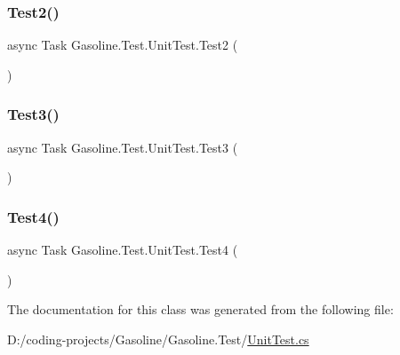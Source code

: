 \mbox{\label{class_gasoline_1_1_test_1_1_unit_test_aabdb54bc89a4d9fc26732e095c0fc06f}} 
\subsubsection{\texorpdfstring{Test2()}{Test2()}}
{\footnotesize\ttfamily async Task Gasoline.\+Test.\+Unit\+Test.\+Test2 (\begin{DoxyParamCaption}{ }\end{DoxyParamCaption})}

\mbox{\label{class_gasoline_1_1_test_1_1_unit_test_a283897be13070c1325c833fe2b4d28b3}} 
\subsubsection{\texorpdfstring{Test3()}{Test3()}}
{\footnotesize\ttfamily async Task Gasoline.\+Test.\+Unit\+Test.\+Test3 (\begin{DoxyParamCaption}{ }\end{DoxyParamCaption})}

\mbox{\label{class_gasoline_1_1_test_1_1_unit_test_a17f40333cb67d58ceff0ef4a4d3f48d2}} 
\subsubsection{\texorpdfstring{Test4()}{Test4()}}
{\footnotesize\ttfamily async Task Gasoline.\+Test.\+Unit\+Test.\+Test4 (\begin{DoxyParamCaption}{ }\end{DoxyParamCaption})}



The documentation for this class was generated from the following file\+:\begin{DoxyCompactItemize}
\item 
D\+:/coding-\/projects/\+Gasoline/\+Gasoline.\+Test/\mbox{\hyperlink{_unit_test_8cs}{Unit\+Test.\+cs}}\end{DoxyCompactItemize}
